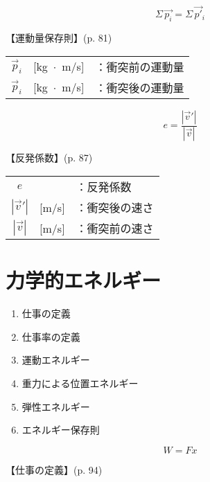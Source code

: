 \documentclass[10pt]{jarticle}
\begin{document}
\newpage
\[
	\Sigma \, \vec{p_i} = \Sigma \, \vec{p'}\!_i
\]

\vskip3mm
【運動量保存則】{\footnotesize (p. 81)}

\begin{tabular}{ccl}
$\vec{p}_i$	&[kg $\!\! \cdot \!\!$ m/s]	&：衝突前の運動量\\
$\vec{p}_i$	&[kg $\!\! \cdot \!\!$ m/s]	&：衝突後の運動量
\end{tabular}





\newpage
\[
	e = \frac{|\vec{v}'|}{|\vec{v}|}
\]


\vskip3mm
【反発係数】{\footnotesize (p. 87)}

\begin{tabular}{ccl}
$e$	&	&：反発係数\\
$|\vec{v}'|$	&[m/s]	&：衝突後の速さ\\
$|\vec{v}|$	&[m/s]	&：衝突前の速さ
\end{tabular}





\newpage
\addtocounter{page}{-1}
\thispagestyle{empty}
\section{力学的エネルギー}

\begin{enumerate}
\setcounter{enumi}{\thepage}
\small
\itemsep-4mm
\item 仕事の定義\\
\item 仕事率の定義\\
\item 運動エネルギー\\
\item 重力による位置エネルギー\\
\item 弾性エネルギー\\
\item エネルギー保存則
\end{enumerate}




\newpage
\[
	W = F x
\]


\vskip3mm
【仕事の定義】{\footnotesize (p. 94)}
\end{document}
